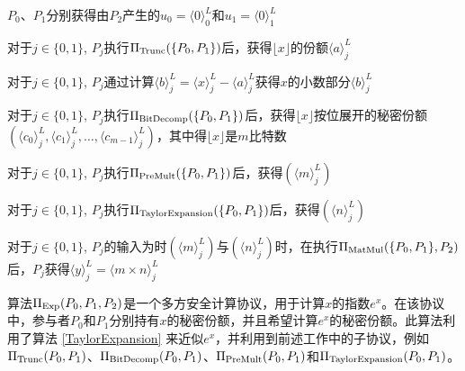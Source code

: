 \begin{algorithm}[H]
	\SetAlgoLined
	
	
	$P_0$、$P_1$分别获得由$P_2$产生的$u_0=\langle 0\rangle_0^L$和$u_1=\langle 0\rangle_1^L$
	
	对于$j\in \{0, 1\}$, $P_j$执行$\Pi_{\rm Trunc}(\{P_0, P_1\})$后，获得$\lfloor x \rfloor$的份额$\langle a\rangle_j^L$
	
	对于$j\in \{0, 1\}$, $P_j$通过计算$\langle b\rangle_j^L = \langle x\rangle_j^L - \langle a\rangle_j^L$获得$x$的小数部分$\langle b\rangle_j^L$
	
	对于$j\in \{0, 1\}$, $P_j$执行$\Pi_{\rm BitDecomp}(\{P_0, P_1\})$后，获得$\lfloor x \rfloor$按位展开的秘密份额$(\langle c_0\rangle_j^L, \langle c_1\rangle_j^L, \dots, \langle c_{m-1}\rangle_j^L)$，其中得$\lfloor x \rfloor$是$m$比特数
	
	
	
	对于$j\in \{0, 1\}$, $P_j$执行$\Pi_{\rm PreMult}(\{P_0, P_1\})$后，获得$(\langle m\rangle_j^L)$
	
	对于$j\in \{0, 1\}$, $P_j$执行$\Pi_{\rm TaylorExpansion}(\{P_0, P_1\})$后，获得$(\langle n\rangle_j^L)$
	
	对于$j\in \{0, 1\}$, $P_j$的输入为时$(\langle m\rangle_j^L)$与$(\langle n\rangle_j^L)$时，在执行$\Pi_{\rm MatMul}(\{P_0, P_1\}, P_2)$后，$P_j$获得$\langle y\rangle_j^L=\langle m\times n\rangle_j^L$
	
	\caption{ $\Pi_{\rm Exp}(\{P_0, P_1\}, P_2)$ }
	\label{Exp}
\end{algorithm}

算法$\Pi_{\rm Exp}({P_0, P_1}, P_2)$是一个多方安全计算协议，用于计算$x$的指数$e^x$。在该协议中，参与者$P_0$和$P_1$分别持有$x$的秘密份额，并且希望计算$e^x$的秘密份额。此算法利用了算法 \ref{TaylorExpansion} 来近似$e^x$，并利用到前述工作\cite{MPC_Fix_Point}中的子协议，例如$\Pi_{\rm Trunc}({P_0, P_1})$、$\Pi_{\rm BitDecomp}({P_0, P_1})$、$\Pi_{\rm PreMult}({P_0, P_1})$和$\Pi_{\rm TaylorExpansion}({P_0, P_1})$。


